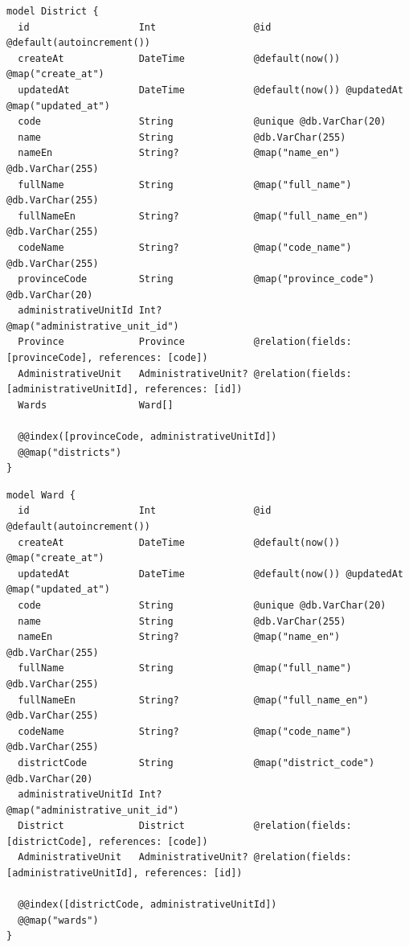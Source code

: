 {\scriptsize
\begin{lstlisting}[caption={Ánh xạ bảng District},captionpos=b]
model District {
  id                   Int                 @id @default(autoincrement())
  createAt             DateTime            @default(now()) @map("create_at")
  updatedAt            DateTime            @default(now()) @updatedAt @map("updated_at")
  code                 String              @unique @db.VarChar(20)
  name                 String              @db.VarChar(255)
  nameEn               String?             @map("name_en") @db.VarChar(255)
  fullName             String              @map("full_name") @db.VarChar(255)
  fullNameEn           String?             @map("full_name_en") @db.VarChar(255)
  codeName             String?             @map("code_name") @db.VarChar(255)
  provinceCode         String              @map("province_code") @db.VarChar(20)
  administrativeUnitId Int?                @map("administrative_unit_id")
  Province             Province            @relation(fields: [provinceCode], references: [code])
  AdministrativeUnit   AdministrativeUnit? @relation(fields: [administrativeUnitId], references: [id])
  Wards                Ward[]

  @@index([provinceCode, administrativeUnitId])
  @@map("districts")
}
\end{lstlisting}}
{\scriptsize
\begin{lstlisting}[caption={Ánh xạ bảng Ward},captionpos=b]
model Ward {
  id                   Int                 @id @default(autoincrement())
  createAt             DateTime            @default(now()) @map("create_at")
  updatedAt            DateTime            @default(now()) @updatedAt @map("updated_at")
  code                 String              @unique @db.VarChar(20)
  name                 String              @db.VarChar(255)
  nameEn               String?             @map("name_en") @db.VarChar(255)
  fullName             String              @map("full_name") @db.VarChar(255)
  fullNameEn           String?             @map("full_name_en") @db.VarChar(255)
  codeName             String?             @map("code_name") @db.VarChar(255)
  districtCode         String              @map("district_code") @db.VarChar(20)
  administrativeUnitId Int?                @map("administrative_unit_id")
  District             District            @relation(fields: [districtCode], references: [code])
  AdministrativeUnit   AdministrativeUnit? @relation(fields: [administrativeUnitId], references: [id])

  @@index([districtCode, administrativeUnitId])
  @@map("wards")
}
\end{lstlisting}}
